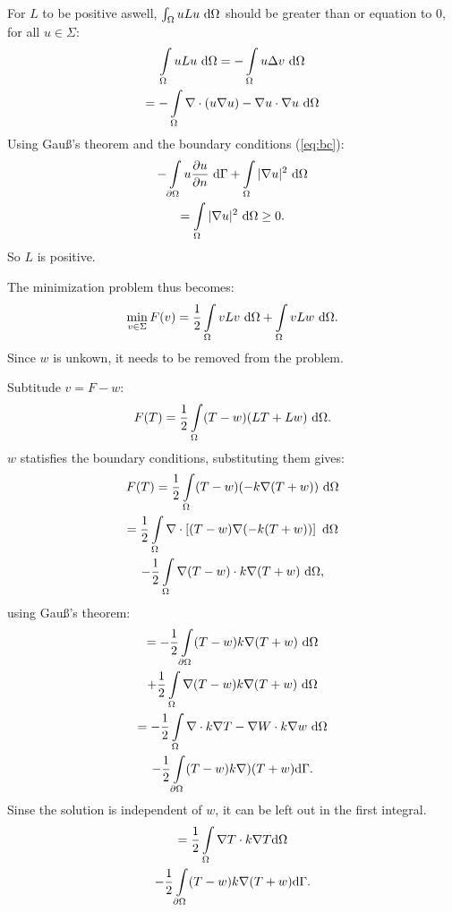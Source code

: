 For $L$ to be positive aswell, $\int\displaylimits_\Omega uLu~\text{d}\Omega$ should be greater than or equation to 0, for all $u\in \Sigma$:
\begin{gather*}
    \int\displaylimits_\Omega uLu~\text{d}\Omega = - \int\displaylimits_\Omega u\Delta v~\text{d}\Omega\\
    = -\int\displaylimits_\Omega \nabla \cdot(u\nabla u) - \nabla u\cdot\nabla u~\text{d}\Omega
\end{gather*} Using Gau\ss's theorem and the boundary conditions (\ref{eq:bc}):
\begin{gather*}
    -\int\displaylimits_{\partial\Omega} u\frac{\partial u}{\partial n}~\text{d}\Gamma + \int\displaylimits_{\Omega} |\nabla u|^2~\text{d}\Omega \\
    =\int\displaylimits_\Omega |\nabla u|^2~\text{d}\Omega \geq 0.
\end{gather*} So $L$ is positive.

The minimization problem thus becomes:
\begin{equation}
    \min_{v\in\Sigma} F(v)=\frac{1}{2}\int\displaylimits_{\Omega}vLv~\text{d}\Omega + \int\displaylimits_{\Omega}vLw~\text{d}\Omega.
\end{equation} Since $w$ is unkown, it needs to be removed from the problem.

Subtitude $v=F-w$:
\begin{equation*}
F(T)=\frac{1}{2}\int\displaylimits_\Omega(T-w)(LT+Lw)~\text{d}\Omega.
\end{equation*} $w$ statisfies the boundary conditions, substituting them gives:
\begin{gather*}
    F(T) = \frac{1}{2}\int\displaylimits_{\Omega}(T-w)(-k\nabla (T+w))~\text{d}\Omega\\
    = \frac{1}{2}\int\displaylimits_{\Omega}\nabla\cdot\left[(T-w)\nabla(-k(T+w))\right]~\text{d}\Omega\\
    - \frac{1}{2}\int\displaylimits_{\Omega}\nabla(T-w)\cdot k\nabla(T+w)~\text{d}\Omega,
\end{gather*}using Gau\ss's theorem:
\begin{gather*}
    = -\frac{1}{2}\int\displaylimits_{\partial\Omega}(T-w)k\nabla(T+w)~\text{d}\Omega\\
    + \frac{1}{2}\int\displaylimits_{\Omega}\nabla(T-w)k\nabla(T+w)~\text{d}\Omega\\
    = -\frac{1}{2}\int\displaylimits_{\Omega}\nabla\cdot k\nabla T - \nabla W\cdot k\nabla w~\text{d}\Omega\\
    -\frac{1}{2}\int\displaylimits_{\partial\Omega}(T-w)k\nabla)(T+w)\text{d}\Gamma.
\end{gather*}Sinse the solution is independent of $w$, it can be left out in the first integral.
\begin{gather*}
    = \frac{1}{2}\int\displaylimits_{\Omega}\nabla T\cdot k\nabla T \text{d}\Omega \\
    -\frac{1}{2}\int\displaylimits_{\partial\Omega}(T-w)k\nabla (T+w)\text{d}\Gamma.
\end{gather*}

